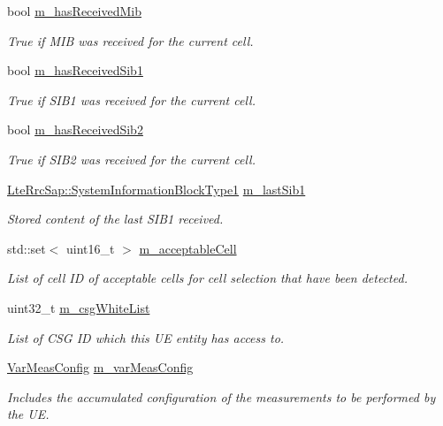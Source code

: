\begin{DoxyCompactItemize}
bool \hyperlink{classns3_1_1LteUeRrc_abcd8b45c6f3ad56f3459e274c79c035e}{m\+\_\+has\+Received\+Mib}
\begin{DoxyCompactList}\small\item\em True if M\+IB was received for the current cell. \end{DoxyCompactList}\item 
bool \hyperlink{classns3_1_1LteUeRrc_a040a3febc680272dee05806ac077ff4d}{m\+\_\+has\+Received\+Sib1}
\begin{DoxyCompactList}\small\item\em True if S\+I\+B1 was received for the current cell. \end{DoxyCompactList}\item 
bool \hyperlink{classns3_1_1LteUeRrc_a477d88924683dd32041cd06877694e8b}{m\+\_\+has\+Received\+Sib2}
\begin{DoxyCompactList}\small\item\em True if S\+I\+B2 was received for the current cell. \end{DoxyCompactList}\item 
\hyperlink{structns3_1_1LteRrcSap_1_1SystemInformationBlockType1}{Lte\+Rrc\+Sap\+::\+System\+Information\+Block\+Type1} \hyperlink{classns3_1_1LteUeRrc_ad9ca8247270fbed524a86dff9bfd4999}{m\+\_\+last\+Sib1}
\begin{DoxyCompactList}\small\item\em Stored content of the last S\+I\+B1 received. \end{DoxyCompactList}\item 
std\+::set$<$ uint16\+\_\+t $>$ \hyperlink{classns3_1_1LteUeRrc_ab2bbe11352c65c6dc52e9809726461ea}{m\+\_\+acceptable\+Cell}
\begin{DoxyCompactList}\small\item\em List of cell ID of acceptable cells for cell selection that have been detected. \end{DoxyCompactList}\item 
uint32\+\_\+t \hyperlink{classns3_1_1LteUeRrc_ac893aad87d7e5a34006b3c4f5a6f89b7}{m\+\_\+csg\+White\+List}
\begin{DoxyCompactList}\small\item\em List of C\+SG ID which this UE entity has access to. \end{DoxyCompactList}\item 
\hyperlink{structns3_1_1LteUeRrc_1_1VarMeasConfig}{Var\+Meas\+Config} \hyperlink{classns3_1_1LteUeRrc_a27a7773eedfdab964d2514d9eeb1c562}{m\+\_\+var\+Meas\+Config}
\begin{DoxyCompactList}\small\item\em Includes the accumulated configuration of the measurements to be performed by the UE. \end{DoxyCompactList}\item 

\end{DoxyCompactItemize}
